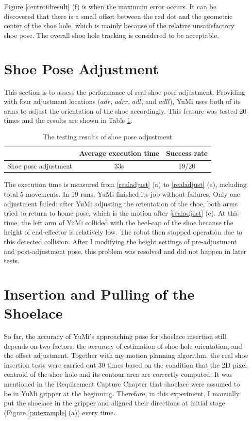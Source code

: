 Figure \ref{centroidresult} (f) is when the maximum error occurs. It can be discovered that there is a small offset between the red dot and the geometric center of the shoe hole, which is mainly because of the relative unsatisfactory shoe pose. The overall shoe hole tracking is considered to be acceptable.

\section{Shoe Pose Adjustment}
This section is to assess the performance of real shoe pose adjustment. Providing with four adjustment locations ($adr$, $adrr$, $adl$, and $adll$), YuMi uses both of its arms to adjust the orientation of the shoe accordingly. This feature was tested 20 times and the results are shown in Table \ref{adjusttest}.

\begin{table}[H]
\centering
\begin{tabular}{||c||c|c||}
\hline
 & Average execution time & Success rate \\ \hline \hline
Shoe pose adjustment & 33s & 19/20 \\ \hline
\end{tabular}
\caption{The testing results of shoe pose adjustment}
\label{adjusttest}
\end{table}

The execution time is measured from \ref{realadjust} (a) to \ref{realadjust} (e), including total 5 movements. In 19 runs, YuMi finished its job without failures. Only one adjustment failed: after YuMi adjusting the orientation of the shoe, both arms tried to return to home pose, which is the motion after \ref{realadjust} (e). At this time, the left arm of YuMi collided with the heel-cap of the shoe because the height of end-effector is relatively low. The robot then stopped operation due to this detected collision. After I modifying the height settings of pre-adjustment and post-adjustment pose, this problem was resolved and did not happen in later tests.


\section{Insertion and Pulling of the Shoelace}
So far, the accuracy of YuMi's approaching pose for shoelace insertion still depends on two factors: the accuracy of estimation of shoe hole orientation, and the offset adjustment. Together with my motion planning algorithm, the real shoe insertion tests were carried out 30 times based on the condition that the 2D pixel centroid of the shoe hole and its contour area are correctly computed. It was mentioned in the Requirement Capture Chapter that shoelace were assumed to be in YuMi gripper at the beginning. Therefore, in this experiment, I manually put the shoelace in the gripper and aligned their directions at initial stage (Figure \ref{putexample} (a)) every time.

